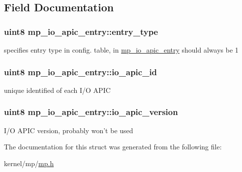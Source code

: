 \subsection{Field Documentation}
\hypertarget{structmp__io__apic__entry_ac64269f891db779398dd61424aa4bb73}{
\subsubsection[{entry\_\-type}]{\setlength{\rightskip}{0pt plus 5cm}uint8 {\bf mp\_\-io\_\-apic\_\-entry::entry\_\-type}}}
\label{structmp__io__apic__entry_ac64269f891db779398dd61424aa4bb73}
specifies entry type in config. table, in \hyperlink{structmp__io__apic__entry}{mp\_\-io\_\-apic\_\-entry} should always be 1 \hypertarget{structmp__io__apic__entry_a20afc2b098573c0f1bef76180503d8e2}{
\subsubsection[{io\_\-apic\_\-id}]{\setlength{\rightskip}{0pt plus 5cm}uint8 {\bf mp\_\-io\_\-apic\_\-entry::io\_\-apic\_\-id}}}
\label{structmp__io__apic__entry_a20afc2b098573c0f1bef76180503d8e2}
unique identified of each I/O APIC \hypertarget{structmp__io__apic__entry_a2b096510834abe7cdac8118c0f5a8c23}{
\subsubsection[{io\_\-apic\_\-version}]{\setlength{\rightskip}{0pt plus 5cm}uint8 {\bf mp\_\-io\_\-apic\_\-entry::io\_\-apic\_\-version}}}
\label{structmp__io__apic__entry_a2b096510834abe7cdac8118c0f5a8c23}
I/O APIC version, probably won't be used 

The documentation for this struct was generated from the following file:\begin{DoxyCompactItemize}
\item 
kernel/mp/\hyperlink{mp_8h}{mp.h}\end{DoxyCompactItemize}
